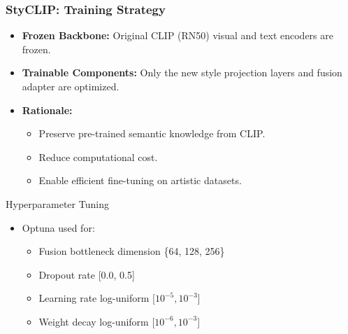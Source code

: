\documentclass[aspectratio=169,xcolor=dvipsnames]{beamer}
\begin{document}
\begin{frame}
  \frametitle{StyCLIP: Training Strategy}
  \begin{itemize}
    \item \textbf{Frozen Backbone:} Original CLIP (RN50) visual and text encoders are frozen.
    \item \textbf{Trainable Components:} Only the new style projection layers and fusion adapter are optimized.
    \item \textbf{Rationale:}
      \begin{itemize}
        \item Preserve pre-trained semantic knowledge from CLIP.
        \item Reduce computational cost.
        \item Enable efficient fine-tuning on artistic datasets.
      \end{itemize}
  \end{itemize}

  \begin{block}{Hyperparameter Tuning}
    \begin{itemize}
        \item Optuna \cite{Optuna} used for:
        \begin{itemize}
            \item Fusion bottleneck dimension \{64, 128, 256\}
            \item Dropout rate [0.0, 0.5]
            \item Learning rate log-uniform [$10^{-5}, 10^{-3}$]
            \item Weight decay log-uniform [$10^{-6}, 10^{-3}$]
        \end{itemize}
    \end{itemize}
  \end{block}
  \tiny \nocite{Optuna}
\end{frame}

\end{document}
